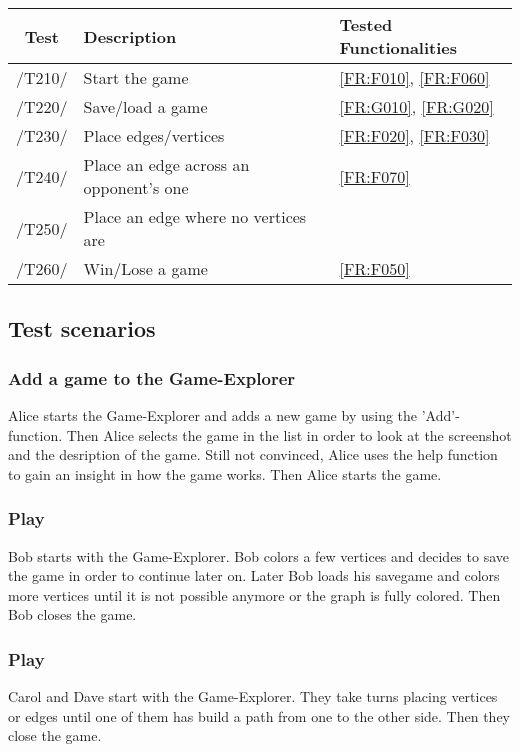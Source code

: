 \begin{tabular}{cll}

\hline
\textbf{Test} & \textbf{Description} & \textbf{Tested Functionalities} \\
\hline
/T210/ & Start the game & \ref{FR:F010}, \ref{FR:F060} \\
/T220/ & Save/load a game & \ref{FR:G010}, \ref{FR:G020} \\
/T230/ & Place edges/vertices & \ref{FR:F020}, \ref{FR:F030} \\
/T240/ & Place an edge across an opponent's one & \ref{FR:F070} \\
/T250/ & Place an edge where no vertices are & \\
/T260/ & Win/Lose a game & \ref{FR:F050} \\
\hline

\end{tabular}

\subsection{Test scenarios}

\subsubsection{Add a game to the Game-Explorer}

Alice starts the Game-Explorer and adds a new game by using the 'Add'-function. Then Alice selects the game in the list in order to look at the screenshot and the desription of the game. Still not convinced, Alice uses the help function to gain an insight in how the game works. Then Alice starts the game.

\subsubsection{Play \graphcoloring}

Bob starts {\graphcoloring} with the Game-Explorer. Bob colors a few vertices and decides to save the game in order to continue later on. Later Bob loads his savegame and colors more vertices until it is not possible anymore or the graph is fully colored. Then Bob closes the game.

\subsubsection{Play \twixt}

Carol and Dave start {\twixt} with the Game-Explorer. They take turns placing vertices or edges until one of them has build a path from one to the other side. Then they close the game.